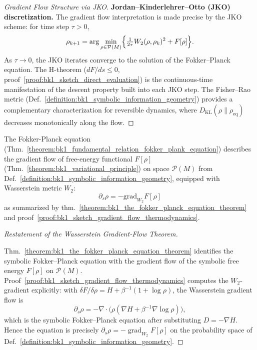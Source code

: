 \begin{theorem}
\begin{proof}[Gradient Flow Structure via JKO]
\textbf{Jordan--Kinderlehrer--Otto (JKO) discretization.}
The gradient flow interpretation is made precise by the JKO scheme: for time step $\tau>0$,
\[
\rho_{k+1} = \arg\min_{\rho\in\mathcal{P}(M)}
\Bigl\{\tfrac{1}{2\tau}W_2(\rho,\rho_k)^2 + F[\rho]\Bigr\}.
\]
As $\tau\to 0$, the JKO iterates converge to the solution of the Fokker--Planck equation.
The H-theorem ($dF/ds\leq 0$, proof~\ref{proof:bk1_sketch_direct_evaluation}) is the
continuous-time manifestation of the descent property built into each JKO step.
The Fisher--Rao metric
(Def.~\ref{definition:bk1_symbolic_information_geometry}) provides a complementary
characterization for reversible dynamics, where $D_{\mathrm{KL}}(\rho\|\rho_{\text{eq}})$
decreases monotonically along the flow.
\end{proof}
\end{theorem}
\begin{corollary}
\label{corollary:bk1_wasserstein_geometric_interpretation}
\leavevmode\newline
The Fokker-Planck equation (Thm.~\ref{theorem:bk1_fundamental_relation_fokker_plank_equation}) describes the gradient flow of free-energy functional $F[\rho]$ (Thm.~\ref{theorem:bk1_variational_principle}) on space $\mathcal{P}(M)$ from Def.~\ref{definition:bk1_symbolic_information_geometry}, equipped with Wasserstein metric $W_2$:
\[
\partial_s \rho = -\text{grad}_{W_2} F[\rho]
\]
as summarized by thm.~\ref{theorem:bk1_the_fokker_planck_equation_theorem} and proof~\ref{proof:bk1_sketch_gradient_flow_thermodynamics}.
\end{corollary}
\begin{proof}[Restatement of the Wasserstein Gradient-Flow Theorem]
\label{proof:bk1_wasserstein_geometric_interpretation}
\leavevmode

Thm.~\ref{theorem:bk1_the_fokker_planck_equation_theorem} identifies the
symbolic Fokker--Planck equation with the gradient flow of the symbolic free
energy \(F[\rho]\) on \(\mathcal{P}(M)\). Proof~\ref{proof:bk1_sketch_gradient_flow_thermodynamics}
computes the \(W_2\)-gradient explicitly: with
\(\delta F/\delta\rho=H+\beta^{-1}(1+\log\rho)\), the Wasserstein gradient flow
is
\[
\partial_s\rho
=-\nabla\cdot\!\bigl(\rho(\nabla H+\beta^{-1}\nabla\log\rho)\bigr),
\]
which is the symbolic Fokker--Planck equation after substituting
\(D=-\nabla H\). Hence the equation is precisely
\(\partial_s\rho=-\operatorname{grad}_{W_2}F[\rho]\) on the probability space
of Def.~\ref{definition:bk1_symbolic_information_geometry}.
\end{proof}
